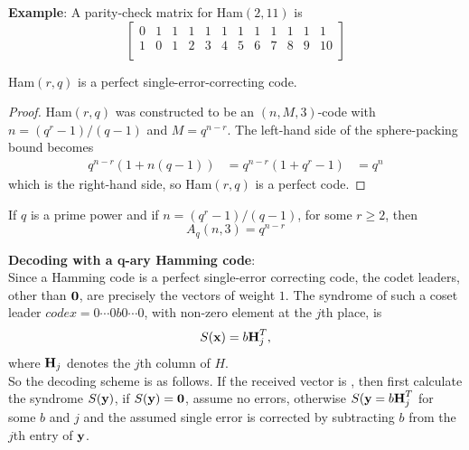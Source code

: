 \documentclass[../main.tex]{subfiles}
\begin{document}
\textbf{Example}: A parity-check matrix for Ham$(2,11)$ is
\[	
	\left[
	\begin{array}{cccccccccccc}
		0 & 1 & 1 & 1 & 1 & 1 & 1 & 1 & 1 & 1 & 1 & 1  \\
		1 & 0 & 1 & 2 & 3 & 4 & 5 & 6 & 7 & 8 & 9 & 10 \\
	\end{array}
	\right]
\]

\begin{thm}
	Ham$(r,q)$ is a perfect single-error-correcting code.
\end{thm}
\begin{proof}
	Ham$(r,q)$ was constructed to be an $(n,M,3)$-code with $n=(q^r-1)/(q-1)$ and $M=q^{n-r}$. The left-hand side of the sphere-packing bound becomes 
	\begin{align}
		q^{n-r}(1 + n(q-1)) &= q^{n-r}(1 + q^r -1)
		&= q^n
	\end{align}
	which is the right-hand side, so Ham$(r,q)$ is a perfect code.	 
\end{proof}

\begin{cor}
	If $q$ is a prime power and if $n=(q^r-1)/(q-1)$, for some $r \geq 2$, then
	\[
		A_q(n,3) = q^{n-r}
	\]
\end{cor}
\vspace{2mm}

\textbf{Decoding with a q-ary Hamming code}:\\
Since a Hamming code is a perfect single-error correcting code, the codet leaders, other than $\textbf{0}$, are precisely the vectors of weight $1$. The syndrome of such a coset leader $code{x} = 0\cdots 0b0\cdots 0$, with non-zero element at the $j$th place, is
\[
	S(\textbf{x}) = b\textbf{H}_j^T,
\]
where $\textbf{H}_j$ denotes the $j$th column of $H$.\\
So the decoding scheme is as follows. If the received vector is , then first calculate the syndrome $S(\textbf{y})$, if $S(\textbf{y})=\textbf{0}$, assume no errors, otherwise $S(\textbf{y} = b\textbf{H}_j^T$ for some $b$ and $j$ and the assumed single error is corrected by subtracting $b$ from the $j$th entry of $\textbf{y}$.
\end{document}

